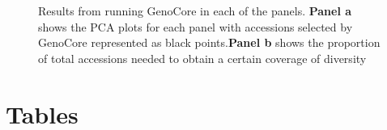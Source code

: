 \documentclass[utf8]{FrontiersinHarvard} %
\begin{document}
\begin{figure}[h]
	\caption{Results from running GenoCore in each of the panels. \textbf{Panel a} shows the PCA plots for each panel with accessions selected by GenoCore represented as black points.\textbf{Panel b} shows the proportion of total accessions needed to obtain a certain coverage of diversity \label{fig:9}}
\end{figure}





\newpage

\section*{Tables}
\end{document}
